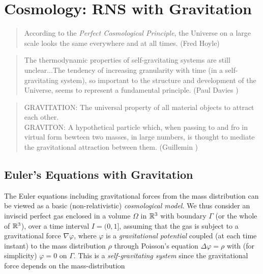 \chapter{Cosmology: RNS with Gravitation}\label{ch:cosmology}

\small
\begin{quote} According to the \emph{Perfect Cosmological Principle}, 
the Universe on a large scale looks the same everywhere and at all times.
(Fred Hoyle)
\end{quote}
\begin{quote} The thermodynamic properties of self-gravitating
systems are still unclear...The tendency of increasing granularity with time
(in a self-gravitating system), so important to the structure and development 
of the Universe, seems to represent a fundamental principle. 
(Paul Davies \cite{davies})
\end{quote}
\begin{quote} 
GRAVITATION: The universal property of all material objects
to attract each other.\\
GRAVITON: A hypothetical particle which, when passing
to and fro in virtual form bewteen two masses, in large numbers,
is thought to mediate the gravitational attraction between them.
(Guillemin \cite{guillemin})
\end{quote}
\normalsize

\normalsize

\section{Euler's Equations with Gravitation}

The Euler equations including gravitational forces from the mass distribution
can be viewed as a basic (non-relativistic) \emph{cosmological model}.  
We thus consider an inviscid perfect gas 
enclosed in a volume $\Omega$ in ${\mathbb{R}}^3$ with boundary $\Gamma$
(or the whole of ${\mathbb{R}}^3$), over a time interval $I=(0,1]$, assuming 
that the gas is subject to a gravitational force $\nabla\varphi$, where
$\varphi$ is a \emph{gravitational potential} 
coupled (at each time instant) to the mass distribution $\rho$  
through Poisson's equation $\Delta\varphi =\rho$
with (for simplicity) $\varphi =0$ on $\Gamma$. This is a 
\emph{self-gravitating system} since the gravitational force depends
on the mass-distribution  

